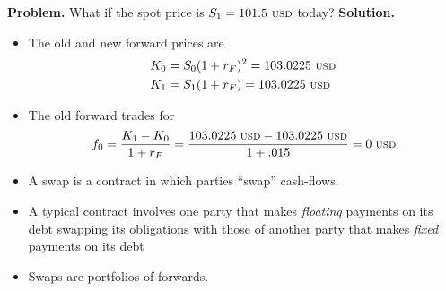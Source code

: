 \documentclass{beamer}
\begin{document}
\begin{frame}{}
	\textbf{Problem.} What if the spot price is $S_{1}=101.5\text{ {\scriptsize USD}}$ today?
	\vfill
	\textbf{Solution.}
    \begin{itemize}
		\item The old and new forward prices are 
            \begin{align}
				K_{0}&=S_{0}(1+r_{F})^{2}=103.0225\text{ {\scriptsize USD}}\\
				K_{1}&=S_{1}(1+r_{F})=103.0225\text{ {\scriptsize USD}}
            \end{align}
        \item The old forward trades for
            \begin{equation}\small
				f_{0}=\frac{K_{1}-K_{0}}{1+r_{F}}=\frac{103.0225\text{ {\scriptsize USD}}-103.0225\text{ {\scriptsize USD}}}{1+.015}=0\text{ {\scriptsize USD}}
            \end{equation}
    \end{itemize}
\end{frame}

\begin{frame}{}
	\begin{itemize}
		\item A swap is a contract in which parties ``swap'' cash-flows. 
		\item A typical contract involves one party that makes \textit{floating} payments on its debt swapping its obligations with those of another party that makes \textit{fixed} payments on its debt
		\item Swaps are portfolios of forwards. 
	\end{itemize}
\end{frame}
\end{document}
